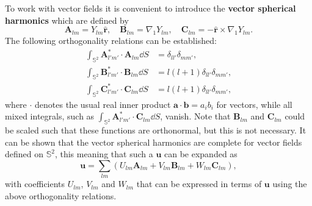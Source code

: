 To work with vector fields it is convenient to introduce the \textbf{vector spherical harmonics} which are defined by
\begin{equation}\label{eq:7}
\mathbf{A}_{lm}=Y_{lm}\hat{\mathbf{r}}, \quad \mathbf{B}_{lm}=\nabla_{1}Y_{lm}, \quad \mathbf{C}_{lm}=-\hat{\mathbf{r}}\times\nabla_{1}Y_{lm}.
\end{equation}
The following orthogonality relations can be established:
\begin{align}
\int_{\mathbb{S}^{2}}\mathbf{A}_{l'm'}^{*}\cdot \mathbf{A}_{lm}\dd S&=\delta_{ll'}\delta_{mm'},\label{eq:8}\\
\int_{\mathbb{S}^{2}}\mathbf{B}_{l'm'}^{*}\cdot \mathbf{B}_{lm}\dd S&=l(l+1)\delta_{ll'}\delta_{mm'},\label{eq:9}\\
\int_{\mathbb{S}^{2}}\mathbf{C}_{l'm'}^{*}\cdot \mathbf{C}_{lm}\dd S&=l(l+1)\delta_{ll'}\delta_{mm'},\label{eq:10}
\end{align}
where $\cdot$ denotes the usual real inner product $\mathbf{a}\cdot \mathbf{b}=a_{i}b_{i}$ for vectors, while all mixed integrals, 
such as $\int_{\mathbb{S}^{2}}\mathbf{A}_{l'm'}^{*}\cdot\mathbf{C}_{lm}\dd S$, vanish. 
Note that $\mathbf{B}_{lm}$ and $\mathbf{C}_{lm}$ could be scaled such that these functions are orthonormal, but this is not necessary. 
It can be shown that the vector spherical harmonics are complete for vector fields defined on $\mathbb{S}^{2}$, this meaning 
that such a $\mathbf{u}$ can be expanded as
\begin{equation}\label{eq:11}
\mathbf{u}=\sum_{lm}(U_{lm}\mathbf{A}_{lm}+V_{lm}\mathbf{B}_{lm}+W_{lm}\mathbf{C}_{lm}),
\end{equation}
with coefficients $U_{lm}$, $V_{lm}$ and $W_{lm}$ that can be expressed in terms of $\mathbf{u}$ using the above orthogonality relations.

